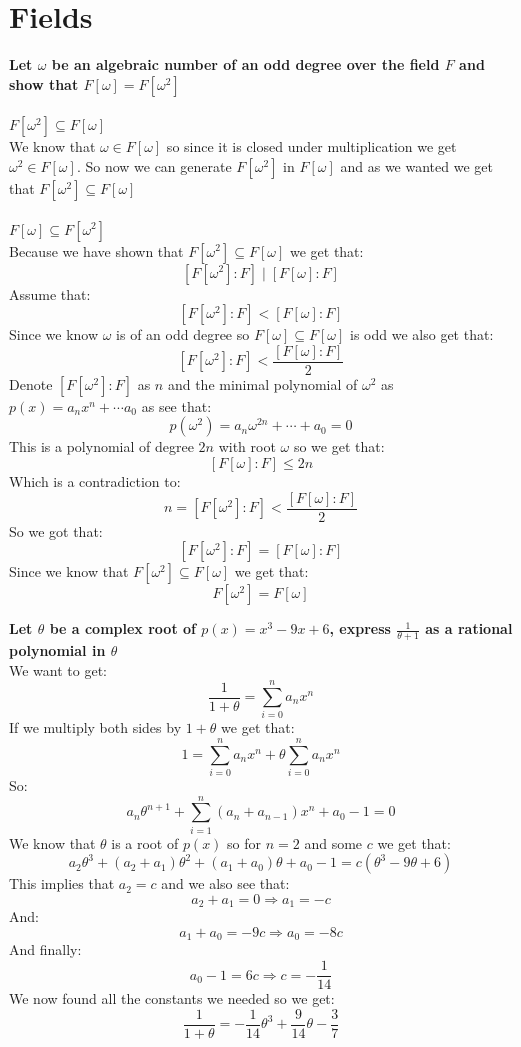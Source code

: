 \documentclass{article}
\theoremstyle{plain}
\begin{document}
	\newpage
	\section{Fields}
	
	\textbf{Let $\omega$ be an algebraic number of an odd degree over the 
	field $F$ and show that $F[\omega]=F[\omega^2]$} \\\\
	\underline{$F[\omega^2] \subseteq F[\omega]$} \\
	We know that $\omega\in F[\omega]$ so since it is closed under 
	multiplication we get $\omega^2\in F[\omega]$. So now we can generate 
	$F[\omega^2]$ in $F[\omega]$ and as we wanted we get that $F[\omega^2] 
	\subseteq F[\omega]$ \\
	\\ \underline{$F[\omega] \subseteq F[\omega^2]$} \\
	Because we have shown that $F[\omega^2] \subseteq F[\omega]$ we get that:
	\[
		[F[\omega^2] \colon F] \mid [F[\omega] \colon F]
	\]
	Assume that:
	\[
		[F[\omega^2] \colon F] < [F[\omega] \colon F]
	\]
	Since we know $\omega$ is of an odd degree so 
	$F[\omega] \subseteq F[\omega]$ is odd we also get that:
	\[
		[F[\omega^2] \colon F] < \frac{[F[\omega] \colon F]}{2}
	\]
	Denote $[F[\omega^2] \colon F]$ as $n$ and the minimal polynomial of 
	$\omega^2$ as $p(x) = a_nx^n+\cdots a_0$ as see that:
	\[
		p(\omega^2) = a_n\omega^{2n}+\cdots+a_0 = 0
	\]
	This is a polynomial of degree $2n$ with root $\omega$ so we get that:
	\[
		[F[\omega] \colon F] \le 2n
	\]
	Which is a contradiction to:
	\[
		n = [F[\omega^2] \colon F] < \frac{[F[\omega] \colon F]}{2}
	\]
	So we got that:
	\[
		[F[\omega^2] \colon F] = [F[\omega] \colon F]
	\]
	Since we know that $F[\omega^2] \subseteq F[\omega]$ we get that:
	\[
		\boxed{F[\omega^2] = F[\omega]}
	\]
	
	\newpage
	
	\textbf{Let $\theta$ be a complex root of $p(x)=x^3-9x+6$, express 
	$\frac{1}{\theta+1}$ as a rational polynomial in $\theta$} \\
	We want to get:
	\[
		\frac{1}{1+\theta} = \sum_{i=0}^{n}{a_nx^n}
	\]
	If we multiply both sides by $1+\theta$ we get that:
	\[
		1 = \sum_{i=0}^{n}{a_nx^n} + \theta \sum_{i=0}^{n}{a_nx^n}
	\]
	So:
	\[
		a_n\theta^{n+1} + \sum_{i=1}^{n}{(a_n + a_{n-1})x^n} + a_0 - 1 = 0
	\]
	We know that $\theta$ is a root of $p(x)$ so for $n=2$ and some $c$ we get
	that:
	\[
		a_2\theta^3 + (a_2+a_1)\theta^2 + (a_1+a_0)\theta + a_0-1 = 
		c(\theta^3-9\theta+6)
	\]
	This implies that $a_2 = c$ and we also see that:
	\[
		a_2+a_1 = 0 \Rightarrow a_1 = -c
	\]
	And:
	\[
		a_1 + a_0 = -9c \Rightarrow a_0 = -8c
	\]
	And finally:
	\[
		a_0 - 1 = 6c \Rightarrow c = -\frac{1}{14}
	\]
	We now found all the constants we needed so we get:
	\[
		\boxed{
		\frac{1}{1+\theta} = -\frac{1}{14}\theta^3 + \frac{9}{14}\theta - 
		\frac{3}{7}}
	\]
	
\end{document}
